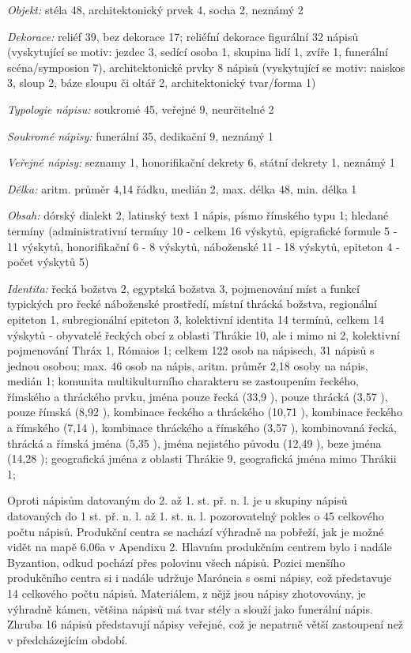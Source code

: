 {\em Objekt:} stéla 48, architektonický prvek 4, socha 2, neznámý 2

{\em Dekorace:} reliéf 39, bez dekorace 17; reliéfní dekorace figurální 32 nápisů (vyskytující se motiv: jezdec 3, sedící osoba 1, skupina lidí 1, zvíře 1, funerální scéna/symposion 7), architektonické prvky 8 nápisů (vyskytující se motiv: naiskos 3, sloup 2, báze sloupu či oltář 2, architektonický tvar/forma 1)

{\em Typologie nápisu:} soukromé 45, veřejné 9, neurčitelné 2

{\em Soukromé nápisy:} funerální 35, dedikační 9, neznámý 1

{\em Veřejné nápisy:} seznamy 1, honorifikační dekrety 6, státní dekrety 1, neznámý 1

{\em Délka:} aritm. průměr 4,14 řádku, medián 2, max. délka 48, min. délka 1

{\em Obsah:} dórský dialekt 2, latinský text 1 nápis, písmo římského typu 1; hledané termíny (administrativní termíny 10 - celkem 16 výskytů, epigrafické formule 5 - 11 výskytů, honorifikační 6 - 8 výskytů, náboženské 11 - 18 výskytů, epiteton 4 - počet výskytů 5)

{\em Identita:} řecká božstva 2, egyptská božstva 3, pojmenování míst a funkcí typických pro řecké náboženské prostředí, místní thrácká božstva, regionální epiteton 1, subregionální epiteton 3, kolektivní identita 14 termínů, celkem 14 výskytů - obyvatelé řeckých obcí z oblasti Thrákie 10, ale i mimo ni 2, kolektivní pojmenování Thráx 1, Rómaios 1; celkem 122 osob na nápisech, 31 nápisů s jednou osobou; max. 46 osob na nápis, aritm. průměr 2,18 osoby na nápis, medián 1; komunita multikulturního charakteru se zastoupením řeckého, římského a thráckého prvku, jména pouze řecká (33,9 ), pouze thrácká (3,57 ), pouze římská (8,92 ), kombinace řeckého a thráckého (10,71 ), kombinace řeckého a římského (7,14 ), kombinace thráckého a římského (3,57 ), kombinovaná řecká, thrácká a římská jména (5,35 ), jména nejistého původu (12,49 ), beze jména (14,28 ); geografická jména z oblasti Thrákie 9, geografická jména mimo Thrákii 1;

\NC\AR
\HL
\HL
\stoptable

Oproti nápisům datovaným do 2. až 1. st. př. n. l. je u skupiny nápisů datovaných do 1 st. př. n. l. až 1. st. n. l. pozorovatelný pokles o 45  celkového počtu nápisů. Produkční centra se nachází výhradně na pobřeží, jak je možné vidět na mapě 6.06a v Apendixu 2. Hlavním produkčním centrem bylo i nadále Byzantion, odkud pochází přes polovinu všech nápisů. Pozici menšího produkčního centra si i nadále udržuje Maróneia s osmi nápisy, což představuje 14  celkového počtu nápisů. Materiálem, z nějž jsou nápisy zhotovovány, je výhradně kámen, většina nápisů má tvar stély a slouží jako funerální nápis. Zhruba 16  nápisů představují nápisy veřejné, což je nepatrně větší zastoupení než v předcházejícím období.

